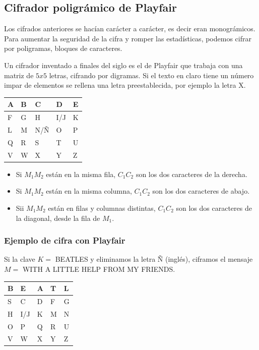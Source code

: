 \documentclass{article}
\newcommand{\RomanNumeralCaps}[1]
    {\MakeUppercase{\romannumeral #1}}
\begin{document}
\subsection{Cifrador poligrámico de Playfair}
\justify
Los cifrados anteriores se hacían carácter a carácter, es decir eran monográmicos. Para aumentar la seguridad de la cifra y romper las estadísticas, podemos cifrar por poligramas, bloques de caracteres. 

Un cifrador inventado a finales del siglo \RomanNumeralCaps{19} es el de Playfair que trabaja con una matriz de $5x5$ letras, cifrando por digramas. Si el texto en claro tiene un número impar de elementos se rellena una letra preestablecida, por ejemplo la letra X.

\begin{table}[htbp]
\begin{tabular}{|l|l|l|l|l|}
\hline 
A & B & C & D & E \\ \hline
F & G & H & I/J & K \\ \hline
L & M & N/Ñ & O & P \\ \hline
Q & R & S & T & U \\ \hline
V & W & X & Y & Z \\ 
\hline
\end{tabular}
\label{tabla:sencilla}

\end{table}

\begin{itemize}
    \item Si $M_{1}M_{2}$ están en la misma fila, $C_{1}C_{2}$ son los dos caracteres de la derecha.
    \item Si $M_{1}M_{2}$ están en la misma columna,  $C_{1}C_{2}$ son los dos caracteres de abajo.
    \item Sii $M_{1}M_{2}$ están en filas y columnas distintas, $C_{1}C_{2}$ son los dos caracteres de la diagonal, desde la fila de $M_{1}$.
\end{itemize}

\subsubsection{Ejemplo de cifra con Playfair}


Si la clave $K=$ BEATLES y eliminamos la letra Ñ (inglés), ciframos el mensaje $M=$ WITH A LITTLE HELP FROM MY FRIENDS. 

\begin{table}[htbp]
\begin{tabular}{|l|l|l|l|l|}
\hline 
B & E & A & T & L \\ \hline
S & C & D & F & G \\ \hline
H & I/J & K & M & N \\ \hline
O & P & Q & R & U \\ \hline
V & W & X & Y & Z \\ 
\hline
\end{tabular}
\end{table}
\end{document}
